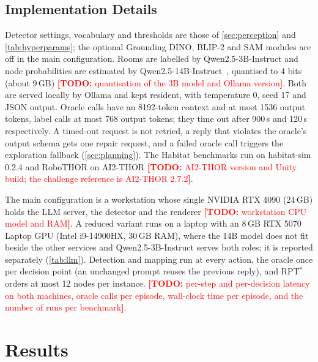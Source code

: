 \documentclass[10pt]{article}
\newcommand{\TODO}[1]{\textcolor{red}{\textbf{[TODO:} #1\textbf{]}}}
\begin{document}
\subsection{Implementation Details}\label{sec:experiments-implementation}

Detector settings, vocabulary and thresholds are those of \cref{sec:perception} and \cref{tab:hyperparams}; the
optional Grounding DINO, BLIP-2 and SAM modules are off in the main configuration. Rooms are labelled by Qwen2.5-3B-Instruct and node probabilities are estimated by
Qwen2.5-14B-Instruct~\citep{yang2024qwen25}, quantised to 4 bits (about 9\,GB)
\TODO{quantisation of the 3B model and Ollama version}. Both are served locally by Ollama and kept resident, with
temperature 0, seed 17 and JSON output. Oracle calls have an 8192-token context and at most 1536 output tokens, label
calls at most 768 output tokens; they time out after 900\,s and 120\,s respectively. A timed-out request is not
retried, a reply that violates the oracle's output schema gets one repair request, and a failed oracle call triggers
the exploration fallback (\cref{sec:planning}). The Habitat benchmarks run on habitat-sim 0.2.4 and RoboTHOR on
AI2-THOR \TODO{AI2-THOR version and Unity build; the challenge reference is AI2-THOR 2.7.2}.

The main configuration is a workstation whose single NVIDIA RTX 4090 (24\,GB) holds the LLM server, the detector and
the renderer \TODO{workstation CPU model and RAM}. A reduced variant runs on a laptop with an 8\,GB RTX 5070 Laptop GPU
(Intel i9-14900HX, 30\,GB RAM), where the 14B model does not fit beside the other services and Qwen2.5-3B-Instruct
serves both roles; it is reported separately (\cref{tab:llm}). Detection and mapping run at every action, the oracle
once per decision point (an unchanged prompt reuses the previous reply), and RPT$^*$ orders at most 12 nodes per
instance. \TODO{per-step and per-decision latency on both machines, oracle calls per episode, wall-clock time per
episode, and the number of runs per benchmark}.

\section{Results}\label{sec:results}
\end{document}
